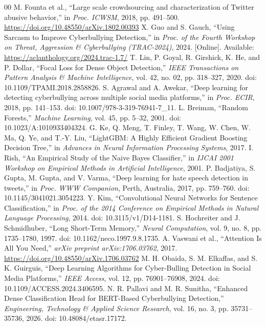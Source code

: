 \documentclass[journal]{IEEEtran}
\begin{document}
\begin{thebibliography}{00}
 M. Founta et al., ``Large scale crowdsourcing and characterization of Twitter abusive behavior,'' in \textit{Proc. ICWSM}, 2018, pp. 491--500. \url{https://doi.org/10.48550/arXiv.1802.00393}
 X. Guo and S. Gauch, ``Using Sarcasm to Improve Cyberbullying Detection,'' in \textit{Proc. of the Fourth Workshop on Threat, Aggression \& Cyberbullying (TRAC-2024)}, 2024. [Online]. Available: \url{https://aclanthology.org/2024.trac-1.7/}
 T. Lin, P. Goyal, R. Girshick, K. He, and P. Dollar, ``Focal Loss for Dense Object Detection,'' \textit{IEEE Transactions on Pattern Analysis \& Machine Intelligence}, vol. 42, no. 02, pp. 318--327, 2020. doi: 10.1109/TPAMI.2018.2858826.
 S. Agrawal and A. Awekar, ``Deep learning for detecting cyberbullying across multiple social media platforms,'' in \textit{Proc. ECIR}, 2018, pp. 141--153. doi: 10.1007/978-3-319-76941-7\_11.
 L. Breiman, ``Random Forests,'' \textit{Machine Learning}, vol. 45, pp. 5--32, 2001. doi: 10.1023/A:1010933404324.
 G. Ke, Q. Meng, T. Finley, T. Wang, W. Chen, W. Ma, Q. Ye, and T.-Y. Liu, ``LightGBM: A Highly Efficient Gradient Boosting Decision Tree,'' in \textit{Advances in Neural Information Processing Systems}, 2017.
 I. Rish, ``An Empirical Study of the Naive Bayes Classifier,'' in \textit{IJCAI 2001 Workshop on Empirical Methods in Artificial Intelligence}, 2001.
 P. Badjatiya, S. Gupta, M. Gupta, and V. Varma, ``Deep learning for hate speech detection in tweets,'' in \textit{Proc. WWW Companion}, Perth, Australia, 2017, pp. 759--760. doi: 10.1145/3041021.3054223.
 Y. Kim, ``Convolutional Neural Networks for Sentence Classification,'' in \textit{Proc. of the 2014 Conference on Empirical Methods in Natural Language Processing}, 2014. doi: 10.3115/v1/D14-1181.
 S. Hochreiter and J. Schmidhuber, ``Long Short-Term Memory,'' \textit{Neural Computation}, vol. 9, no. 8, pp. 1735--1780, 1997. doi: 10.1162/neco.1997.9.8.1735.
 A. Vaswani et al., ``Attention Is All You Need,'' \textit{arXiv preprint arXiv:1706.03762}, 2017. \url{https://doi.org/10.48550/arXiv.1706.03762}
 M. H. Obaida, S. M. Elkaffas, and S. K. Guirguis, ``Deep Learning Algorithms for Cyber-Bulling Detection in Social Media Platforms,'' \textit{IEEE Access}, vol. 12, pp. 76901--76908, 2024. doi: 10.1109/ACCESS.2024.3406595.
 N. R. Pallavi and M. R. Sunitha, ``Enhanced Dense Classification Head for BERT-Based Cyberbullying Detection,'' \textit{Engineering, Technology \& Applied Science Research}, vol. 16, no. 3, pp. 35731--35736, 2026. doi: 10.48084/etasr.17172.

\end{thebibliography}
\end{document}
